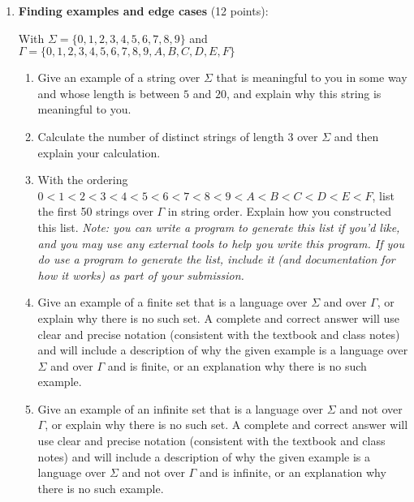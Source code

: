 \begin{enumerate}[wide, labelwidth=!, labelindent=0pt]
\item\textbf{Finding examples and edge cases} (12 points):

With $\Sigma= \{0,1,2,3,4,5,6,7,8,9\}$
and $\Gamma = \{0,1,2, 3, 4, 5,6, 7, 8, 9, A, B, C, D, E, F\}$

    \begin{enumerate}
    \item\gradeCompleteFirst  Give an example of a string over $\Sigma$ that is meaningful to you in some way
    and whose length is between $5$ and $20$, and explain 
    why this string is meaningful to you.

    \item\gradeComplete Calculate the number of distinct strings of length 3 over $\Sigma$ and then 
     explain your calculation.

    \item\gradeComplete With the ordering $0 < 1 < 2 < 3 < 4< 5< 6< 7 < 8 < 9< A < B < C < D< E< F$, 
    list the first 50 strings over $\Gamma$ in string order. Explain how you constructed this list.
    {\it Note: you can write a program
    to generate this list if you'd like, and you may use any external tools to help you write this program.
    If you do use a program to generate the list, include it (and documentation for how it works) as part of your
    submission.}

    \item\gradeCorrectFirst Give an example of a finite set that is a language over $\Sigma$ and over $\Gamma$, 
    or explain why there is no such set. A complete and correct answer will use clear and precise notation 
    (consistent with the textbook and class notes) and will include a description of why the given example 
    is a language over $\Sigma$ and over $\Gamma$ and is finite, or an explanation why there is no such example.
    
    \item\gradeCorrect Give an example of an infinite set that is a language over $\Sigma$  and not over $\Gamma$, 
    or explain why there is no such set. A complete and correct answer will use clear and precise notation
    (consistent with the textbook and class notes) and will include a description of why the given example 
    is a language over $\Sigma$ and not over $\Gamma$ and is infinite, or an explanation why there is no such example.

    \end{enumerate}


\end{enumerate}
